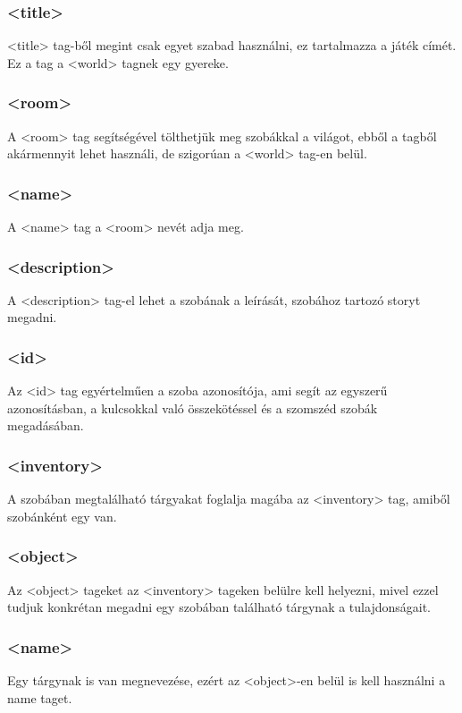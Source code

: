 \documentclass{scrarticle}
\begin{document}
\subsubsection{<title>}
<title> tag-ből megint csak egyet szabad használni, ez tartalmazza a játék címét. Ez a tag a <world> tagnek egy gyereke.

\subsubsection{<room>}
A <room> tag segítségével tölthetjük meg szobákkal a világot, ebből a tagből akármennyit lehet használi, de szigorúan a <world> tag-en belül.

\subsubsection{<name>}
A <name> tag a <room> nevét adja meg.

\subsubsection{<description>}
A <description> tag-el lehet a szobának a leírását, szobához tartozó storyt megadni.

\subsubsection{<id>}
Az <id> tag egyértelműen a szoba azonosítója, ami segít az egyszerű azonosításban, a kulcsokkal való összekötéssel és a szomszéd szobák megadásában.

\subsubsection{<inventory>}
A szobában megtalálható tárgyakat foglalja magába az <inventory> tag, amiből szobánként egy van.

\subsubsection{<object>}
Az <object> tageket az <inventory> tageken belülre kell helyezni, mivel ezzel tudjuk konkrétan megadni egy szobában található tárgynak a tulajdonságait.

\subsubsection{<name>}
Egy tárgynak is van megnevezése, ezért az <object>-en belül is kell használni a name taget.
\end{document}
